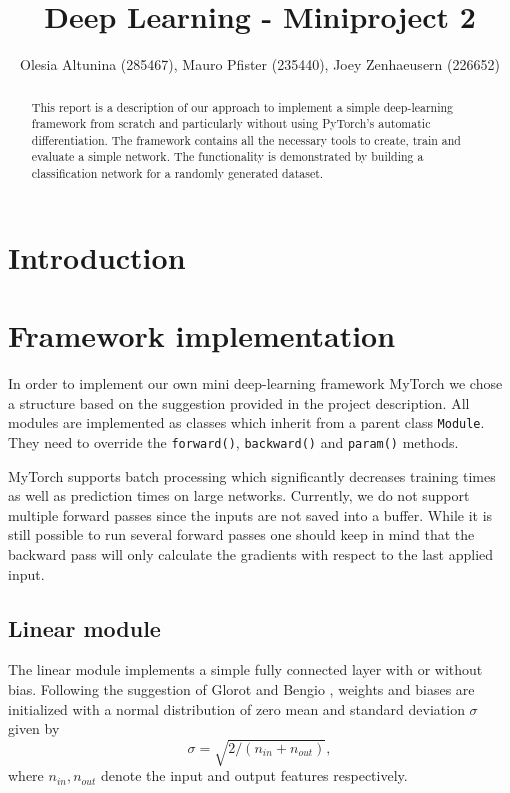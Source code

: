 \documentclass[10pt,conference,compsocconf]{IEEEtran}
\begin{document}
\title{Deep Learning - Miniproject 2}

\author{
  Olesia Altunina (285467), Mauro Pfister (235440), Joey Zenhaeusern (226652)
}

\maketitle

\begin{abstract}
This report is a description of our approach to implement a simple deep-learning framework from scratch and particularly without using PyTorch's automatic differentiation. The framework contains all the necessary tools to create, train and evaluate a simple network. The functionality is demonstrated by building a classification network for a randomly generated dataset. 
\end{abstract}

\section{Introduction}

\section{Framework implementation}
In order to implement our own mini deep-learning framework MyTorch we chose a structure based on the suggestion provided in the project description. All modules are implemented as classes which inherit from a parent class \texttt{Module}. They need to override the \texttt{forward()}, \texttt{backward()} and \texttt{param()} methods.

MyTorch supports batch processing which significantly decreases training times as well as prediction times on large networks. Currently, we do not support multiple forward passes since the inputs are not saved into a buffer. While it is still possible to run several forward passes one should keep in mind that the backward pass will only calculate the gradients with respect to the last applied input.

\subsection{Linear module}
The linear module implements a simple fully connected layer with or without bias. Following the suggestion of Glorot and Bengio \cite{pmlr-v9-glorot10a}, weights and biases are initialized with a normal distribution of zero mean and standard deviation $\sigma$ given by
\begin{equation} \label{eq:Winit}
  \sigma = \sqrt{2 / (n_{in} + n_{out})},
\end{equation}
where $n_{in}, n_{out}$ denote the input and output features respectively.\\
\end{document}
